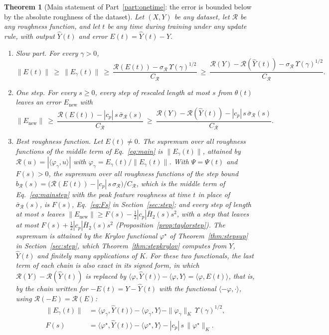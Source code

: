 \documentclass[11pt]{article}
\newtheorem{theorem}{Theorem}
\theoremstyle{definition}
\theoremstyle{remark}
\newcommand{\Rgh}{\mathcal{R}}           %
\newcommand{\sR}{\sigma_{\Rgh}}
\newcommand{\CR}{C_{\Rgh}}
\newcommand{\ip}[2]{\langle #1,#2\rangle}
\begin{document}
\begin{theorem}[Main statement of Part~\ref{part:onetime}: the error is bounded below by the absolute roughness of the dataset]\label{thm:slow}
Let $(X, Y)$ be any dataset, let $\Rgh$ be any roughness function, and let $t$ be any time during training under any update rule, with output $\hat Y(t)$ and error $E(t) = \hat Y(t) - Y$.
\begin{enumerate}[label=(\alph*)]
\item \emph{Slow part.} For every $\gamma > 0$,
\begin{equation}\label{eq:main}
\|E(t)\| \ \ge\ \|E_\gamma(t)\| \ \ge\ \frac{\Rgh(E(t)) - \sR\,\Upsilon(\gamma)^{1/2}}{\CR} \ \ge\ \frac{\Rgh(Y) - \Rgh(\hat Y(t)) - \sR\,\Upsilon(\gamma)^{1/2}}{\CR}.
\end{equation}
\item \emph{One step.} For every $s \ge 0$, every step of rescaled length at most $s$ from $\theta(t)$ leaves an error $E_{\mathrm{new}}$ with
\begin{equation}\label{eq:mainstep}
\|E_{\mathrm{new}}\| \ \ge\ \frac{\Rgh(E(t)) - |c_p|\,s\,\bar\sigma_\Rgh(s)}{\CR} \ \ge\ \frac{\Rgh(Y) - \Rgh(\hat Y(t)) - |c_p|\,s\,\bar\sigma_\Rgh(s)}{\CR}.
\end{equation}
\item \emph{Best roughness function.} Let $E(t) \neq 0$.
The supremum over all roughness functions of the middle term of Eq.~\eqref{eq:main} is $\|E_\gamma(t)\|$, attained by $\Rgh(u) = |\ip{\varphi_\gamma}{u}|$ with $\varphi_\gamma = E_\gamma(t)/\|E_\gamma(t)\|$.
With $\Psi = \Psi(t)$ and $F(s) > 0$, the supremum over all roughness functions of the step bound $b_\Rgh(s) = \big(\Rgh(E(t)) - |c_p|\,s\,\sR\big)/\CR$, which is the middle term of Eq.~\eqref{eq:mainstep} with the peak feature roughness at time $t$ in place of $\bar\sigma_\Rgh(s)$, is $F(s)$, Eq.~\eqref{eq:Fs} in Section~\ref{sec:step}; and every step of length at most $s$ leaves $\|E_{\mathrm{new}}\|\ge F(s) - \tfrac12|c_p|\bar H_2(s)s^2$, with a step that leaves at most $F(s) + \tfrac12|c_p|\bar H_2(s)s^2$ (Proposition~\ref{prop:taylorstep}).
The supremum is attained by the Krylov functional $\varphi^\star$ of Theorem~\ref{thm:stepsup} in Section~\ref{sec:step}, which Theorem~\ref{thm:stepkrylov} computes from $Y$, $\hat Y(t)$ and finitely many applications of $K$.
For these two functionals, the last term of each chain is also exact in its signed form, in which $\Rgh(Y) - \Rgh(\hat Y(t))$ is replaced by $\ip{\varphi}{\hat Y(t)} - \ip{\varphi}{Y} = \ip{\varphi}{E(t)}$, that is, by the chain written for $-E(t) = Y - \hat Y(t)$ with the functional $\ip{-\varphi}{\cdot}$, using $\Rgh(-E) = \Rgh(E)$:
\begin{equation}\label{eq:mainexact}
\begin{aligned}
\|E_\gamma(t)\| &= \ip{\varphi_\gamma}{\hat Y(t)} - \ip{\varphi_\gamma}{Y} - \|\varphi_\gamma\|_K\,\Upsilon(\gamma)^{1/2},\\
F(s) &= \ip{\varphi^\star}{\hat Y(t)} - \ip{\varphi^\star}{Y} - |c_p|\,s\,\|\varphi^\star\|_K .
\end{aligned}
\end{equation}
\end{enumerate}
\end{theorem}
\end{document}
